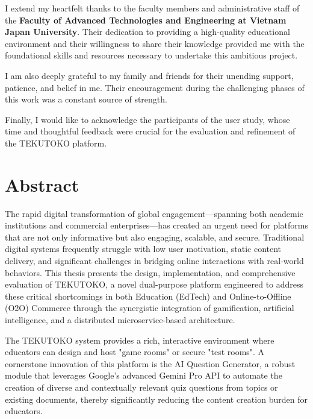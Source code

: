 I extend my heartfelt thanks to the faculty members and administrative staff of the \textbf{Faculty of Advanced Technologies and Engineering at Vietnam Japan University}. Their dedication to providing a high-quality educational environment and their willingness to share their knowledge provided me with the foundational skills and resources necessary to undertake this ambitious project.

I am also deeply grateful to my family and friends for their unending support, patience, and belief in me. Their encouragement during the challenging phases of this work was a constant source of strength.

Finally, I would like to acknowledge the participants of the user study, whose time and thoughtful feedback were crucial for the evaluation and refinement of the TEKUTOKO platform.

\tableofcontents
\listoffigures
\listoftables
\cleardoublepage

\chapter*{Abstract}
The rapid digital transformation of global engagement—spanning both academic institutions and commercial enterprises—has created an urgent need for platforms that are not only informative but also engaging, scalable, and secure. Traditional digital systems frequently struggle with low user motivation, static content delivery, and significant challenges in bridging online interactions with real-world behaviors. This thesis presents the design, implementation, and comprehensive evaluation of TEKUTOKO, a novel dual-purpose platform engineered to address these critical shortcomings in both Education (EdTech) and Online-to-Offline (O2O) Commerce through the synergistic integration of gamification, artificial intelligence, and a distributed microservice-based architecture.

The TEKUTOKO system provides a rich, interactive environment where educators can design and host "game rooms" or secure "test rooms". A cornerstone innovation of this platform is the AI Question Generator, a robust module that leverages Google's advanced Gemini Pro API to automate the creation of diverse and contextually relevant quiz questions from topics or existing documents, thereby significantly reducing the content creation burden for educators.

